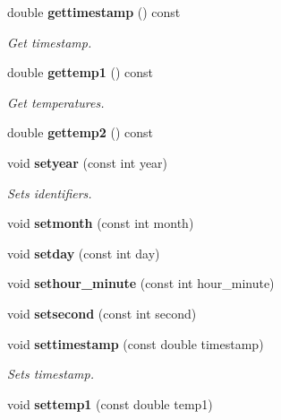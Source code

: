 \begin{DoxyCompactItemize}
\item 
double {\bf gettimestamp} () const \label{classCALICE_1_1ScECALTemperature_ab3ef29a9e1200f3a5dfc1e6b225f1dfc}

\begin{DoxyCompactList}\small\item\em Get timestamp. \end{DoxyCompactList}\item 
double {\bf gettemp1} () const \label{classCALICE_1_1ScECALTemperature_a6dd7af50cc894061f0e50d36d812b940}

\begin{DoxyCompactList}\small\item\em Get temperatures. \end{DoxyCompactList}\item 
double {\bfseries gettemp2} () const \label{classCALICE_1_1ScECALTemperature_a82a592bc57f805615cd4176bd7cdb06e}

\item 
void {\bf setyear} (const int year)\label{classCALICE_1_1ScECALTemperature_ad5f653b16b28db8b389184d9fc0de712}

\begin{DoxyCompactList}\small\item\em Sets identifiers. \end{DoxyCompactList}\item 
void {\bfseries setmonth} (const int month)\label{classCALICE_1_1ScECALTemperature_a127fa120ab01339922da6214dec09fc2}

\item 
void {\bfseries setday} (const int day)\label{classCALICE_1_1ScECALTemperature_a421550046b4bff4d6ba3715a515f3889}

\item 
void {\bfseries sethour\-\_\-minute} (const int hour\-\_\-minute)\label{classCALICE_1_1ScECALTemperature_abbb5a0a11a0d5d2e21f20759132991ed}

\item 
void {\bfseries setsecond} (const int second)\label{classCALICE_1_1ScECALTemperature_a5d6d0e550c855be85780be82eecb74ec}

\item 
void {\bf settimestamp} (const double timestamp)\label{classCALICE_1_1ScECALTemperature_a4e137896866cc87c77827488a656609a}

\begin{DoxyCompactList}\small\item\em Sets timestamp. \end{DoxyCompactList}\item 
void {\bf settemp1} (const double temp1)\label{classCALICE_1_1ScECALTemperature_ac4419e9fc44285ee4d8a3ef12ca5d175}


\end{DoxyCompactItemize}
